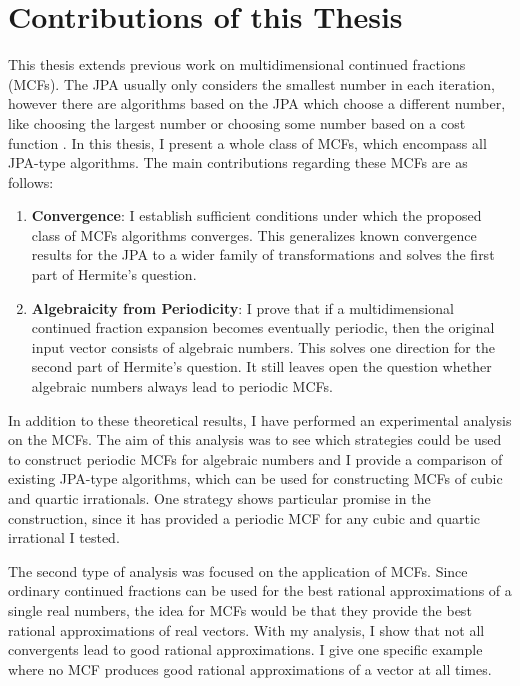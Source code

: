 \section{Contributions of this Thesis}

This thesis extends previous work on multidimensional continued fractions (MCFs).
The JPA usually only considers the smallest number in each iteration,
however there are algorithms based on the JPA which choose a different number,
like choosing the largest number \cite{Podsypanin77} or choosing some number
based on a cost function \cite{Tamura09}.
In this thesis, I present a whole class of MCFs,
which encompass all JPA-type algorithms.
The main contributions regarding these MCFs are as follows:
\begin{enumerate}
  \item \textbf{Convergence}:
    I establish sufficient conditions under which the proposed class of MCFs
    algorithms converges.
    This generalizes known convergence results for the JPA to a wider family of
    transformations and solves the first part of Hermite's question.
  \item \textbf{Algebraicity from Periodicity}:
    I prove that if a multidimensional continued fraction expansion becomes
    eventually periodic, then the original input vector consists of algebraic
    numbers.
    This solves one direction for the second part of Hermite's question.
    It still leaves open the question whether algebraic numbers always lead to
    periodic MCFs.
\end{enumerate}

In addition to these theoretical results,
I have performed an experimental analysis on the MCFs.
The aim of this analysis was to see which strategies could be used
to construct periodic MCFs for algebraic numbers
and I provide a comparison of existing JPA-type algorithms,
which can be used for constructing MCFs of cubic and quartic irrationals.
One strategy shows particular promise in the construction,
since it has provided a periodic MCF for any cubic and quartic irrational I tested.

The second type of analysis was focused on the application of MCFs.
Since ordinary continued fractions can be used for the best rational approximations
of a single real numbers, the idea for MCFs would be that they provide the best
rational approximations of real vectors.
With my analysis, I show that not all convergents lead to good rational approximations.
I give one specific example where no MCF produces good rational
approximations of a vector at all times.

